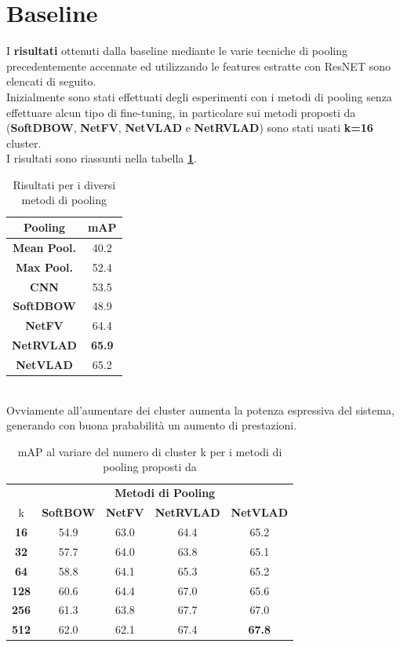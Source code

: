 \section{Baseline}
I \textbf{risultati} ottenuti dalla baseline mediante le varie tecniche di pooling precedentemente accennate ed utilizzando le features estratte con ResNET sono elencati di seguito.\cite{soccerNet} 
\\Inizialmente sono stati effettuati degli esperimenti con i metodi di pooling senza effettuare alcun tipo di fine-tuning, in particolare sui metodi proposti da \citet{MiechPooling} (\textbf{SoftDBOW}, \textbf{NetFV}, \textbf{NetVLAD} e \textbf{NetRVLAD}) sono stati usati \textbf{k=16} cluster.
\\I risultati sono riassunti nella tabella \textbf{\ref{table: baselinek16}}.
\begin{table}[ht]
\caption{Risultati per i diversi metodi di pooling}
\centering
\begin{tabular}{c| | c}
\textbf{Pooling} & \textbf{mAP} \\
\hline
\textbf{Mean Pool.} & 40.2 \\
\textbf{Max Pool.} &  52.4\\
\textbf{CNN} & 53.5\\
\textbf{SoftDBOW} & 48.9\\
\textbf{NetFV} & 64.4\\
\textbf{NetRVLAD} & \textbf{65.9}\\
\textbf{NetVLAD} & 65.2\\ [1ex]

\end{tabular}
\label{table: baselinek16}
\end{table}
\\Ovviamente all'aumentare dei cluster aumenta la potenza espressiva del sistema, generando con buona prababilità un aumento di prestazioni.
\begin{table}[ht]

\caption{mAP al variare del numero di cluster k per i metodi di pooling proposti da \citet{MiechPooling}}
\label{table: baselinek16to512}
\centering
\begin{tabular}{c| | c|c|c |  c}
&\multicolumn{4}{c}{\textbf{Metodi di Pooling}} \\
k & \textbf{SoftBOW} & \textbf{NetFV} & \textbf{NetRVLAD} & \textbf{NetVLAD} \\
\hline
\textbf{16}& 54.9 & 63.0 & 64.4 & 65.2 \\
\textbf{32} & 57.7 & 64.0 & 63.8 & 65.1 \\
\textbf{64}& 58.8 &  64.1 & 65.3 & 65.2 \\
\textbf{128}& 60.6 & 64.4 & 67.0 & 65.6 \\
\textbf{256}& 61.3 & 63.8 & 67.7 & 67.0 \\
\textbf{512} & 62.0 & 62.1 & 67.4 & \textbf{67.8} \\[1ex]

\end{tabular}
\end{table}

